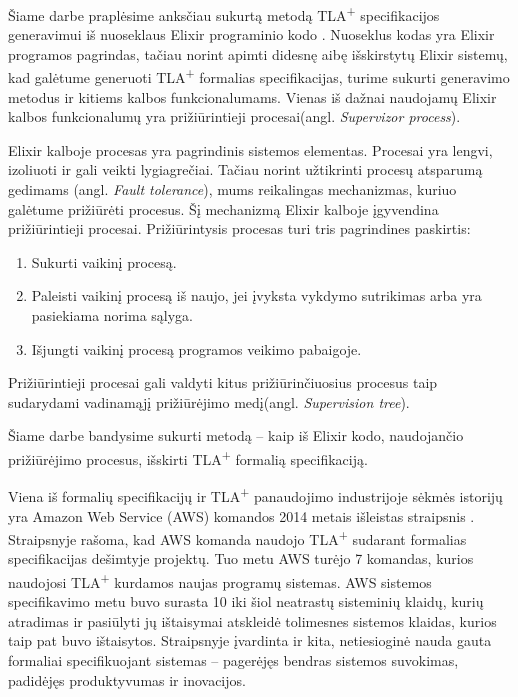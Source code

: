 \documentclass{VUMIFPSmagistrinis}
\begin{document}
        Šiame darbe praplėsime anksčiau sukurtą metodą TLA\textsuperscript{+} specifikacijos generavimui iš nuoseklaus Elixir programinio kodo \cite{bravzenas2023tla+}. 
        Nuoseklus kodas yra Elixir programos pagrindas, tačiau norint apimti didesnę aibę išskirstytų
        Elixir sistemų, kad galėtume generuoti TLA\textsuperscript{+} formalias specifikacijas, turime sukurti generavimo metodus ir kitiems kalbos funkcionalumams.
        Vienas iš dažnai naudojamų Elixir kalbos funkcionalumų yra prižiūrintieji procesai(angl. {\it Supervizor process}).
        
        Elixir kalboje procesas yra pagrindinis sistemos elementas.
        Procesai yra lengvi, izoliuoti ir gali veikti lygiagrečiai.
        Tačiau norint užtikrinti procesų atsparumą gedimams (angl. {\it Fault tolerance}), mums reikalingas mechanizmas, kuriuo galėtume prižiūrėti procesus.
        Šį mechanizmą Elixir kalboje įgyvendina prižiūrintieji procesai.
        Prižiūrintysis procesas turi tris pagrindines paskirtis:
        \begin{enumerate}
            \item {Sukurti vaikinį procesą.}
            \item {Paleisti vaikinį procesą iš naujo, jei įvyksta vykdymo sutrikimas arba yra pasiekiama norima sąlyga.}
            \item {Išjungti vaikinį procesą programos veikimo pabaigoje.}
        \end{enumerate}

        Prižiūrintieji procesai gali valdyti kitus prižiūrinčiuosius procesus taip sudarydami vadinamąjį
        prižiūrėjimo medį(angl. {\it Supervision tree}).

        Šiame darbe bandysime sukurti metodą -- kaip iš Elixir kodo, naudojančio prižiūrėjimo procesus, išskirti TLA\textsuperscript{+} formalią specifikaciją.


		Viena iš formalių specifikacijų ir TLA\textsuperscript{+} panaudojimo industrijoje sėkmės istorijų yra Amazon Web Service (AWS) komandos 2014 metais išleistas straipsnis \cite{newcombe2014use}.
		Straipsnyje rašoma, kad AWS komanda naudojo TLA\textsuperscript{+} sudarant formalias specifikacijas dešimtyje projektų. Tuo metu AWS turėjo 7 komandas, kurios naudojosi TLA\textsuperscript{+} kurdamos naujas programų sistemas.
		AWS sistemos specifikavimo metu buvo surasta 10 iki šiol neatrastų sisteminių klaidų, kurių atradimas ir pasiūlyti jų ištaisymai atskleidė tolimesnes sistemos klaidas, kurios taip pat buvo ištaisytos.
		Straipsnyje įvardinta ir kita, netiesioginė nauda gauta formaliai specifikuojant sistemas -- pagerėjęs bendras sistemos suvokimas, padidėjęs produktyvumas ir inovacijos.
		
\end{document}
